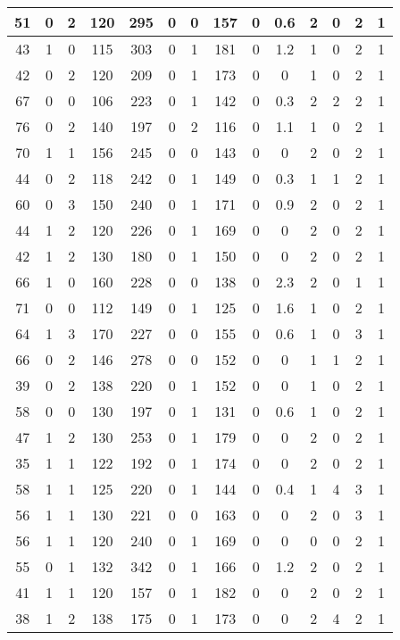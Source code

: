 \documentclass{article}
\begin{document}
\begin{longtable}{|c|c|c|c|c|c|c|c|c|c|c|c|c|c|}
\hline
51 & 0 & 2 & 120 & 295 & 0 & 0 & 157 & 0 & 0.6 & 2 & 0 & 2 & 1\\
\hline
43 & 1 & 0 & 115 & 303 & 0 & 1 & 181 & 0 & 1.2 & 1 & 0 & 2 & 1\\
\hline
42 & 0 & 2 & 120 & 209 & 0 & 1 & 173 & 0 & 0 & 1 & 0 & 2 & 1\\
\hline
67 & 0 & 0 & 106 & 223 & 0 & 1 & 142 & 0 & 0.3 & 2 & 2 & 2 & 1\\
\hline
76 & 0 & 2 & 140 & 197 & 0 & 2 & 116 & 0 & 1.1 & 1 & 0 & 2 & 1\\
\hline
70 & 1 & 1 & 156 & 245 & 0 & 0 & 143 & 0 & 0 & 2 & 0 & 2 & 1\\
\hline
44 & 0 & 2 & 118 & 242 & 0 & 1 & 149 & 0 & 0.3 & 1 & 1 & 2 & 1\\
\hline
60 & 0 & 3 & 150 & 240 & 0 & 1 & 171 & 0 & 0.9 & 2 & 0 & 2 & 1\\
\hline
44 & 1 & 2 & 120 & 226 & 0 & 1 & 169 & 0 & 0 & 2 & 0 & 2 & 1\\
\hline
42 & 1 & 2 & 130 & 180 & 0 & 1 & 150 & 0 & 0 & 2 & 0 & 2 & 1\\
\hline
66 & 1 & 0 & 160 & 228 & 0 & 0 & 138 & 0 & 2.3 & 2 & 0 & 1 & 1\\
\hline
71 & 0 & 0 & 112 & 149 & 0 & 1 & 125 & 0 & 1.6 & 1 & 0 & 2 & 1\\
\hline
64 & 1 & 3 & 170 & 227 & 0 & 0 & 155 & 0 & 0.6 & 1 & 0 & 3 & 1\\
\hline
66 & 0 & 2 & 146 & 278 & 0 & 0 & 152 & 0 & 0 & 1 & 1 & 2 & 1\\
\hline
39 & 0 & 2 & 138 & 220 & 0 & 1 & 152 & 0 & 0 & 1 & 0 & 2 & 1\\
\hline
58 & 0 & 0 & 130 & 197 & 0 & 1 & 131 & 0 & 0.6 & 1 & 0 & 2 & 1\\
\hline
47 & 1 & 2 & 130 & 253 & 0 & 1 & 179 & 0 & 0 & 2 & 0 & 2 & 1\\
\hline
35 & 1 & 1 & 122 & 192 & 0 & 1 & 174 & 0 & 0 & 2 & 0 & 2 & 1\\
\hline
58 & 1 & 1 & 125 & 220 & 0 & 1 & 144 & 0 & 0.4 & 1 & 4 & 3 & 1\\
\hline
56 & 1 & 1 & 130 & 221 & 0 & 0 & 163 & 0 & 0 & 2 & 0 & 3 & 1\\
\hline
56 & 1 & 1 & 120 & 240 & 0 & 1 & 169 & 0 & 0 & 0 & 0 & 2 & 1\\
\hline
55 & 0 & 1 & 132 & 342 & 0 & 1 & 166 & 0 & 1.2 & 2 & 0 & 2 & 1\\
\hline
41 & 1 & 1 & 120 & 157 & 0 & 1 & 182 & 0 & 0 & 2 & 0 & 2 & 1\\
\hline
38 & 1 & 2 & 138 & 175 & 0 & 1 & 173 & 0 & 0 & 2 & 4 & 2 & 1\\

\end{longtable}
\end{document}
